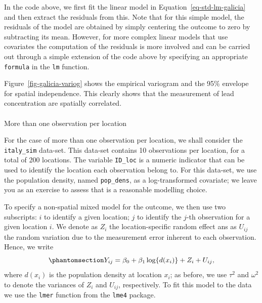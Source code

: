 \documentclass[
  letterpaper,
]{krantz}
\makeatletter
\let\oldparagraph\paragraph
\renewcommand{\paragraph}{
    \@ifstar
      \xxxParagraphStar
      \xxxParagraphNoStar
  }
\newcommand{\xxxParagraphStar}[1]{\oldparagraph*{#1}\mbox{}}
\newcommand{\xxxParagraphNoStar}[1]{\oldparagraph{#1}\mbox{}}
\makeatother
\begin{document}
In the code above, we first fit the linear model in
Equation~\ref{eq-std-lm-galicia} and then extract the residuals from
this. Note that for this simple model, the residuals of the model are
obtained by simply centering the outcome to zero by subtracting its
mean. However, for more complex linear models that use covariates the
computation of the residuals is more involved and can be carried out
through a simple extension of the code above by specifying an
appropriate \texttt{formula} in the \texttt{lm} function.

Figure~\ref{fig-galicia-variog} shows the empirical variogram and the
95\% envelope for spatial independence. This clearly shows that the
measurement of lead concentration are spatially correlated.

\paragraph{More than one observation per
location}\label{sec-explanal-lm}

For the case of more than one observation per location, we shall
consider the \texttt{italy\_sim} data-set. This data-set contains 10
observations per location, for a total of 200 locations. The variable
\texttt{ID\_loc} is a numeric indicator that can be used to identify the
location each observation belong to. For this data-set, we use the
population density, named \texttt{pop\_dens}, as a log-transformed
covariate; we leave you as an exercise to assess that is a reasonable
modelling choice.

To specify a non-spatial mixed model for the outcome, we then use two
subscripts: \(i\) to identify a given location; \(j\) to identify the
\(j\)-th observation for a given location \(i\). We denote as \(Z_i\)
the location-specific random effect ans as \(U_{ij}\) the random
variation due to the measurement error inherent to each observation.
Hence, we write \begin{equation}\phantomsection\label{eq-italy-sim-lmm}{
Y_{ij} = \beta_0 + \beta_1 \log\{d(x_i)\} + Z_i + U_{ij},
}\end{equation} where \(d(x_i)\) is the population density at location
\(x_i\); as before, we use \(\tau^2\) and \(\omega^2\) to denote the
variances of \(Z_i\) and \(U_{ij}\), respectively. To fit this model to
the data we use the \texttt{lmer} function from the \texttt{lme4}
package.
\end{document}
